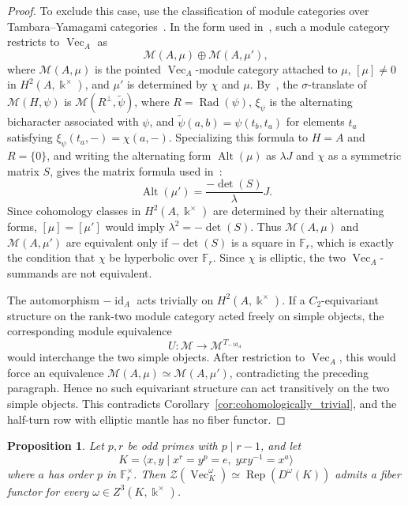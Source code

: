\documentclass[12pt]{amsart}
\theoremstyle{plain}
\newtheorem{proposition}[theorem]{Proposition}
\theoremstyle{definition} %
\theoremstyle{remark} %
\newcommand{\ku}{{\Bbbk}} %
\DeclareMathOperator{\VecCat}{Vec}
\newcommand{\ModCat}{\mathcal{M}}
\newcommand{\Vect}[1]{\VecCat_{#1}}
\newcommand{\cM}{\mathcal{M}}
\newcommand{\id}{\operatorname{id}}
\newcommand{\Rep}{\operatorname{Rep}}
\newcommand{\Alt}{\operatorname{Alt}}
\begin{document}
\begin{proof}
To exclude this case, use the classification of module categories over Tambara--Yamagami categories~\cite[Section~9]{MeMu12}. In the form used in~\cite[Lemma~4.3 and Remark~4.5]{Nik08}, such a module category restricts to $\Vect{A}$ as
\[
\ModCat(A,\mu)\oplus \ModCat(A,\mu'),
\]
where $\ModCat(A,\mu)$ is the pointed $\Vect{A}$-module category attached to $\mu$, $[\mu]\ne0$ in $H^2(A,\ku^\times)$, and $\mu'$ is determined by $\chi$ and $\mu$. By~\cite[Lemma~9.1]{MeMu12}, the $\sigma$-translate of $\ModCat(H,\psi)$ is $\ModCat(R^\perp,\widetilde\psi)$, where $R=\operatorname{Rad}(\psi)$, $\xi_\psi$ is the alternating bicharacter associated with $\psi$, and $\widetilde\psi(a,b)=\psi(t_b,t_a)$ for elements $t_a$ satisfying $\xi_\psi(t_a,-)=\chi(a,-)$. Specializing this formula to $H=A$ and $R=\{0\}$, and writing the alternating form $\Alt(\mu)$ as $\lambda J$ and $\chi$ as a symmetric matrix $S$, gives the matrix formula used in~\cite[Remark~4.5]{Nik08}:
\[
\Alt(\mu')=\frac{-\det(S)}{\lambda}J.
\]
Since cohomology classes in $H^2(A,\ku^\times)$ are determined by their alternating forms, $[\mu]=[\mu']$ would imply $\lambda^2=-\det(S)$. Thus $\ModCat(A,\mu)$ and $\ModCat(A,\mu')$ are equivalent only if $-\det(S)$ is a square in $\mathbb{F}_r$, which is exactly the condition that $\chi$ be hyperbolic over $\mathbb{F}_r$. Since $\chi$ is elliptic, the two $\Vect{A}$-summands are not equivalent.

The automorphism $-\id_A$ acts trivially on $H^2(A,\ku^\times)$. If a $C_2$-equivariant structure on the rank-two module category acted freely on simple objects, the corresponding module equivalence
\[
U:\cM\to\cM^{T_{-\id_A}}
\]
would interchange the two simple objects. After restriction to $\Vect{A}$, this would force an equivalence $\ModCat(A,\mu)\simeq \ModCat(A,\mu')$, contradicting the preceding paragraph. Hence no such equivariant structure can act transitively on the two simple objects. This contradicts Corollary~\ref{cor:cohomologically_trivial}, and the half-turn row with elliptic mantle has no fiber functor.
\end{proof}

\begin{proposition}\label{prop:frobenius_prime_cyclic_positive}
Let $p,r$ be odd primes with $p\mid r-1$, and let
\[
K=\langle x,y\mid x^r=y^p=e,\; yxy^{-1}=x^a\rangle
\]
where $a$ has order $p$ in $\mathbb{F}_r^\times$. Then $\mathcal{Z}(\Vect{K}^{\omega})\simeq \Rep(D^\omega(K))$ admits a fiber functor for every $\omega\in Z^3(K,\ku^\times)$.
\end{proposition}
\end{document}
